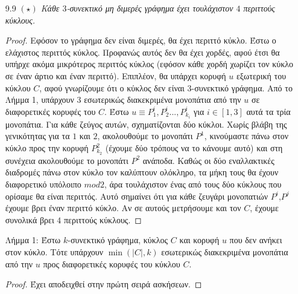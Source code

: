 \documentclass[a4paper, oneside, 11pt]{article}
\theoremstyle{definition}
\begin{document}
\begin{enumerate}
   \item[9.9] \emph{$(\star)$ Κάθε $3$-συνεκτικό μη διμερές γράφημα έχει τουλάχιστον $4$ περιττούς κύκλους.}
\begin{proof}
	Εφόσον το γράφημα δεν είναι διμερές, θα έχει περιττό κύκλο. Έστω ο ελάχιστος περιττός κύκλος. Προφανώς αυτός δεν θα έχει χορδές, αφού έτσι θα υπήρχε ακόμα μικρότερος περιττός κύκλος (εφόσον
	κάθε χορδή χωρίζει τον κύκλο σε έναν άρτιο και έναν περιττό). Επιπλέον, θα υπάρχει κορυφή $u$ εξωτερική του κύκλου $C$, 
	αφού γνωρίζουμε ότι ο κύκλος δεν είναι $3$-συνεκτικό γράφημα. Από το Λήμμα 1, υπάρχουν 3 εσωτερικώς διακεκριμένα μονοπάτια από την $u$ σε διαφορετικές κορυφές του $C$. Έστω 
	$u\equiv P_1^i,P_2^i...,P_{k_i}^i$ για $i\in [1,3]$ αυτά τα τρία μονοπάτια. Για κάθε ζεύγος αυτών, σχηματίζονται δύο κύκλοι. Χωρίς βλάβη της γενικότητας για τα $1$ και $2$, ακολουθούμε το
	μονοπάτι $P^1$, κινούμαστε πάνω στον κύκλο προς την κορυφή $P_{k_2}^2$ (έχουμε δύο τρόπους να το κάνουμε αυτό) και στη συνέχεια ακολουθούμε το μονοπάτι $P^2$ ανάποδα. Καθώς οι δύο εναλλακτικές
	διαδρομές πάνω στον κύκλο τον καλύπτουν ολόκληρο, τα μήκη τους θα έχουν διαφορετικό 
	υπόλοιπο $mod 2$, άρα τουλάχιστον ένας από τους δύο κύκλους που ορίσαμε θα είναι περιττός.
	Αυτό σημαίνει ότι για κάθε ζευγάρι μονοπατιών $P^i$,$P^j$ έχουμε βρει έναν περιττό κύκλο. Αν σε αυτούς
	μετρήσουμε και τον $C$, έχουμε συνολικά βρει $4$ περιττούς κύκλους.
\end{proof}
Λήμμα 1:
\newline
	Έστω $k$-συνεκτικό γράφημα, κύκλος $C$ και κορυφή $u$ που δεν ανήκει στον κύκλο. Τότε υπάρχουν $\min(|C|,k)$ εσωτερικώς διακεκριμένα μονοπάτια από την $u$ προς διαφορετικές κορυφές του
	κύκλου $C$.
\begin{proof}
	Έχει αποδειχθεί στην πρώτη σειρά ασκήσεων.
\end{proof}
	
\end{enumerate}
\end{document}
